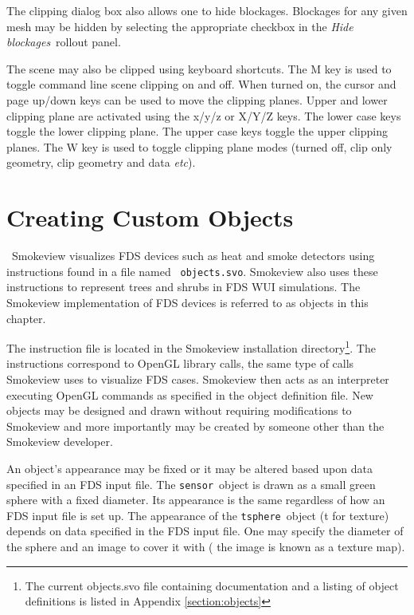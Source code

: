 \documentclass[11pt,twoside]{book}
\begin{document}
The clipping dialog box also allows one to hide blockages.  Blockages for any given mesh may be hidden
by selecting the appropriate checkbox in the {\em Hide blockages}\ rollout panel.

The scene may also be clipped using keyboard shortcuts.
The M key is used to toggle command line scene clipping on and off.  When turned on, the
cursor and page up/down keys can be used to move the clipping planes.
Upper and lower clipping plane are activated using the x/y/z or X/Y/Z keys.
The lower case keys toggle the lower clipping plane.  The upper case
keys toggle the upper clipping planes.
The W key is used to toggle clipping plane modes (turned off, clip only geometry, clip geometry and data
{\em etc}).



\chapter{Creating Custom Objects}
\label{chap:devices}\ Smokeview visualizes FDS devices such as heat
and smoke detectors using instructions found in a file named {\tt
objects.svo}. Smokeview also uses these instructions to represent trees
and shrubs in FDS WUI simulations. The Smokeview implementation of
FDS devices is referred to as objects in this chapter.

The instruction file is located in the  Smokeview installation
directory\footnote{The current objects.svo file containing
documentation and a listing of object definitions is listed in
Appendix \ref{section:objects}}. The instructions correspond to
OpenGL library calls, the same type of calls Smokeview uses to
visualize FDS cases. Smokeview then acts as an interpreter
executing OpenGL commands as specified in the object definition
file. New objects
may be designed and drawn without requiring modifications to
Smokeview and more importantly may be created by someone other
than the Smokeview developer.

An object's appearance may be fixed or it may be altered based
upon data specified in an FDS input file.  The {\tt sensor}\
object is drawn as a small green sphere with a fixed diameter.
Its appearance is the same regardless of how an FDS input file is
set up. The appearance of the {\tt tsphere}\ object (t for
texture) depends on data specified in the FDS input file.  One may
specify the diameter of the sphere and an image to cover it with (
the image is known as a texture map).
\end{document}
